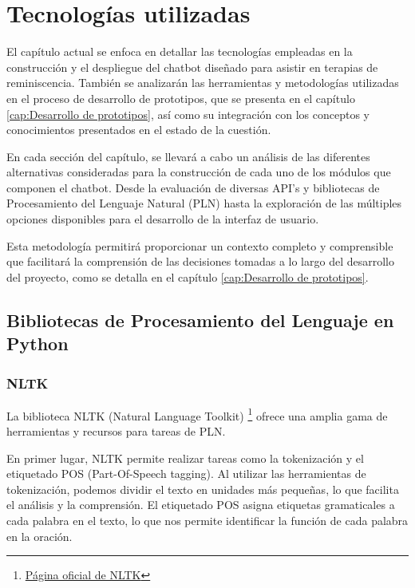 \chapter{Tecnologías utilizadas}
\label{cap:TecnologiasUtilizadas}

El capítulo actual se enfoca en detallar las tecnologías empleadas en la construcción y el despliegue del chatbot diseñado para asistir en terapias de reminiscencia. También se analizarán las herramientas y metodologías utilizadas en el proceso de desarrollo de prototipos, que se presenta en el capítulo \ref{cap:Desarrollo de prototipos}, así como su integración con los conceptos y conocimientos presentados en el estado de la cuestión.

En cada sección del capítulo, se llevará a cabo un análisis de las diferentes alternativas consideradas para la construcción de cada uno de los módulos que componen el chatbot. Desde la evaluación de diversas API's y bibliotecas de Procesamiento del Lenguaje Natural (PLN) hasta la exploración de las múltiples opciones disponibles para el desarrollo de la interfaz de usuario.

Esta metodología permitirá proporcionar un contexto completo y comprensible que facilitará la comprensión de las decisiones tomadas a lo largo del desarrollo del proyecto, como se detalla en el capítulo \ref{cap:Desarrollo de prototipos}. 
\newpage


\section{Bibliotecas de Procesamiento del Lenguaje en Python}

\subsection{NLTK}
La biblioteca NLTK (Natural Language Toolkit) \footnote{\href{https://www.nltk.org/}{Página oficial de NLTK}} ofrece una amplia gama de herramientas y recursos para tareas de PLN.

En primer lugar, NLTK permite realizar tareas como la tokenización y el  etiquetado POS (Part-Of-Speech tagging). Al utilizar las herramientas de tokenización, podemos dividir el texto en unidades más pequeñas, lo que facilita el análisis y la comprensión. El etiquetado POS asigna etiquetas gramaticales a cada palabra en el texto, lo que nos permite identificar la función de cada palabra en la oración. \\

